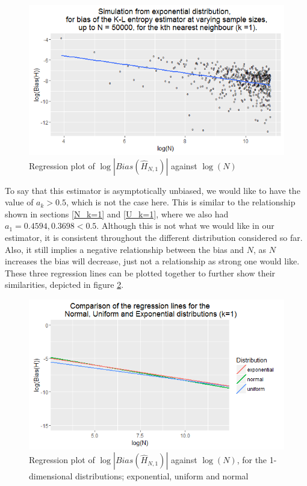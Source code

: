 \documentclass{article}
\begin{document}
\begin{figure}
  \begin{center}
    \includegraphics[width=\textwidth]{./Graphs/Expo_k=1_plot.png}
  \end{center}
\caption{Regression plot of $\log|Bias(\hat{H}_{N, 1})|$ against $\log(N)$}
  \label{expo_k=1_graph}
\end{figure}

To say that this estimator is asymptotically unbiased, we would like to have the value of $a_{k} > 0.5$, which is not the case here. This is similar to the relationship shown in sections \ref{N_k=1} and \ref{U_k=1}, where we also had $a_{1} = 0.4594, 0.3698 < 0.5$. Although this is not what we would like in our estimator, it is consistent throughout the different distribution considered so far. Also, it still implies a negative relationship between the bias and $N$, as $N$ increases the bias will decrease, just not a relationship as strong one would like. These three regression lines can be plotted together to further show their similarities, depicted in figure \ref{E_U_N_k=1_graph}.

\begin{figure}
  \begin{center}
    \includegraphics[width=\textwidth]{./Graphs/EUN_k=1_plot.png}
  \end{center}
\caption{Regression plot of $\log|Bias(\hat{H}_{N, 1})|$ against $\log(N)$, for the 1-dimensional distributions; exponential, uniform and normal}
  \label{E_U_N_k=1_graph}
\end{figure}
\end{document}
